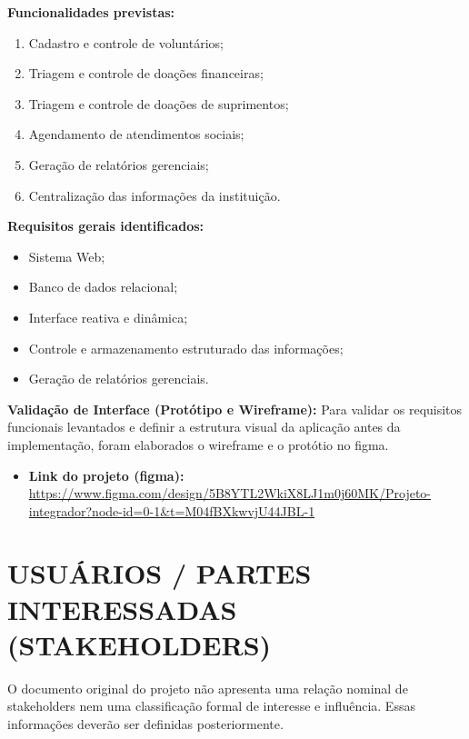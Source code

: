 \documentclass[12pt,a4paper]{article}
\begin{document}
\textbf{Funcionalidades previstas:}

\begin{enumerate}
    \item Cadastro e controle de voluntários;
    \item Triagem e controle de doações financeiras;
    \item Triagem e controle de doações de suprimentos;
    \item Agendamento de atendimentos sociais;
    \item Geração de relatórios gerenciais;
    \item Centralização das informações da instituição.
\end{enumerate}

\textbf{Requisitos gerais identificados:}

\begin{itemize}
    \item Sistema Web;
    \item Banco de dados relacional;
    \item Interface reativa e dinâmica;
    \item Controle e armazenamento estruturado das informações;
    \item Geração de relatórios gerenciais.
\end{itemize}

\textbf{Validação de Interface (Protótipo e Wireframe):}
Para validar os requisitos funcionais levantados e definir a estrutura visual da aplicação antes da implementação, foram elaborados o wireframe e o protótio no figma.

\begin{itemize}
    \item \textbf{Link do projeto (figma):} \url{https://www.figma.com/design/5B8YTL2WkiX8LJ1m0j60MK/Projeto-integrador?node-id=0-1&t=M04fBXkwvjU44JBL-1}
\end{itemize}


\section*{USUÁRIOS / PARTES INTERESSADAS (STAKEHOLDERS)}

O documento original do projeto não apresenta uma relação nominal de
stakeholders nem uma classificação formal de interesse e influência.
Essas informações deverão ser definidas posteriormente.
\end{document}
